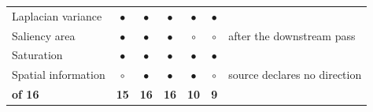 \begin{table}[!ht]
\begin{tabular}{@{}l ccccc >{\raggedright\arraybackslash}p{3.2cm}@{}}
Laplacian variance & \textcolor{accentgreen!70!black}{\textbf{$\bullet$}} & \textcolor{accentgreen!70!black}{\textbf{$\bullet$}} & \textcolor{accentgreen!70!black}{\textbf{$\bullet$}} & \textcolor{accentgreen!70!black}{\textbf{$\bullet$}} & \textcolor{accentgreen!70!black}{\textbf{$\bullet$}} & \textcolor{black!55}{\scriptsize } \\
\rowcolor{rowlight}Saliency area & \textcolor{accentgreen!70!black}{\textbf{$\bullet$}} & \textcolor{accentgreen!70!black}{\textbf{$\bullet$}} & \textcolor{accentgreen!70!black}{\textbf{$\bullet$}} & \textcolor{black!28}{$\circ$} & \textcolor{black!28}{$\circ$} & \textcolor{black!55}{\scriptsize after the downstream pass} \\
Saturation & \textcolor{accentgreen!70!black}{\textbf{$\bullet$}} & \textcolor{accentgreen!70!black}{\textbf{$\bullet$}} & \textcolor{accentgreen!70!black}{\textbf{$\bullet$}} & \textcolor{accentgreen!70!black}{\textbf{$\bullet$}} & \textcolor{accentgreen!70!black}{\textbf{$\bullet$}} & \textcolor{black!55}{\scriptsize } \\
\rowcolor{rowlight}Spatial information & \textcolor{black!28}{$\circ$} & \textcolor{accentgreen!70!black}{\textbf{$\bullet$}} & \textcolor{accentgreen!70!black}{\textbf{$\bullet$}} & \textcolor{accentgreen!70!black}{\textbf{$\bullet$}} & \textcolor{black!28}{$\circ$} & \textcolor{black!55}{\scriptsize source declares no direction} \\
\midrule
\textbf{of 16} & \textbf{15} & \textbf{16} & \textbf{16} & \textbf{10} & \textbf{9} & \\
\bottomrule
\end{tabular}
\end{table}
